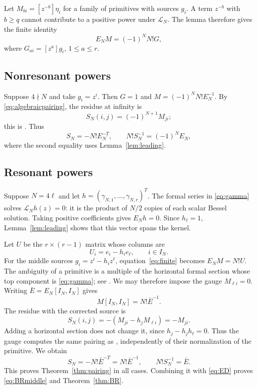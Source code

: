 \documentclass[11pt]{article}
\theoremstyle{definition}
\numberwithin{equation}{section}
\begin{document}
Let $M_{bi}=[z^{-b}]\eta_i$ for a family of primitives with sources
$g_i$. A term $z^{-b}$ with $b\ge q$ cannot contribute to a positive
power under $\mathcal L_N$. The lemma therefore gives the finite identity
\begin{equation}\label{eq:finite}
 E_NM=(-1)^NN!G,
\end{equation}
where $G_{ai}=[z^a]g_i$, $1\le a\le r$.

\subsection{Nonresonant powers}
Suppose $4\nmid N$ and take $g_i=z^i$.
Then $G=1$ and $M=(-1)^NN!E_N^{-1}$.
By \eqref{eq:algebraicpairing}, the residue at infinity is
\begin{equation}\label{eq:residue}
 S_N(i,j)=(-1)^{N+1}M_{ji};
\end{equation}
this is \cite[formula (3.15)]{FSY}.
Thus
\[
 S_N=-N!E_N^{-T},\qquad N!S_N^{-1}=(-1)^NE_N,
\]
where the second equality uses Lemma~\ref{lem:leading}.

\subsection{Resonant powers}
Suppose $N=4\ell$ and let
$h=(\gamma_{N,1},\ldots,\gamma_{N,r})^T$.
The formal series in \eqref{eq:gamma} solves $\mathcal L_Nh(z)=0$:
it is the product of $N/2$ copies of each scalar Bessel solution.
Taking positive coefficients gives $E_Nh=0$.
Since $h_\ell=1$, Lemma~\ref{lem:leading} shows that this vector
spans the kernel.

Let $U$ be the $r\times(r-1)$ matrix whose columns are
\begin{equation}\label{eq:U}
 U_i=e_i-h_ie_\ell,\qquad i\in I_N.
\end{equation}
For the middle sources $g_i=z^i-h_iz^\ell$,
equation~\eqref{eq:finite} becomes $E_NM=N!U$.
The ambiguity of a primitive is a multiple of the horizontal formal
section whose top component is \eqref{eq:gamma}; see
\cite[Proposition 3.8]{FSY}. We may therefore impose the gauge
$M_{\ell i}=0$.
Writing $\bar E=E_N[I_N,I_N]$ gives
\[
 M[I_N,I_N]=N!\bar E^{-1}.
\]
The residue with the corrected source is
\[
 S_N(i,j)=-(M_{ji}-h_jM_{\ell i})=-M_{ji}.
\]
Adding a horizontal section does not change it, since
$h_j-h_jh_\ell=0$. Thus the gauge computes the same pairing as
\cite[formula (3.16)]{FSY}, independently of their normalization of
the primitive. We obtain
\[
 S_N=-N!\bar E^{-T}=N!\bar E^{-1},\qquad N!S_N^{-1}=\bar E.
\]
This proves Theorem~\ref{thm:pairing} in all cases.
Combining it with \eqref{eq:ED} proves \eqref{eq:BRmiddle} and
Theorem~\ref{thm:BR}.
\end{document}
